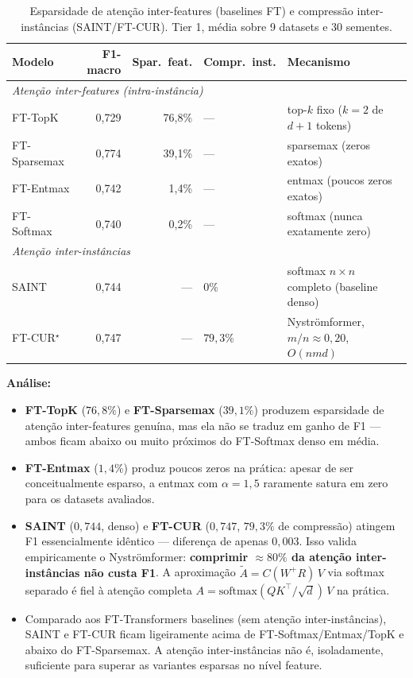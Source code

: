 \documentclass[12pt,a4paper]{article}
\begin{document}
\begin{table}[H]
\centering
\caption{Esparsidade de atenção inter-features (baselines FT) e compressão
inter-instâncias (SAINT/FT-CUR). Tier 1, média sobre 9 datasets e 30 sementes.}
\label{tab:sparsity_ft}
\begin{tabular}{lrrll}
\toprule
\textbf{Modelo} & \textbf{F1-macro} & \textbf{Spar.\ feat.} & \textbf{Compr.\ inst.} & \textbf{Mecanismo} \\
\midrule
\multicolumn{5}{l}{\textit{Atenção inter-features (intra-instância)}} \\
FT-TopK      & 0,729 & 76,8\% & --- & top-$k$ fixo ($k{=}2$ de $d{+}1$ tokens) \\
FT-Sparsemax & 0,774 & 39,1\% & --- & sparsemax (zeros exatos) \\
FT-Entmax    & 0,742 &  1,4\% & --- & entmax (poucos zeros exatos) \\
FT-Softmax   & 0,740 &  0,2\% & --- & softmax (nunca exatamente zero) \\
\midrule
\multicolumn{5}{l}{\textit{Atenção inter-instâncias}} \\
SAINT        & 0,744 & --- & $0\%$  & softmax $n{\times}n$ completo (baseline denso) \\
FT-CUR$^\star$ & 0,747 & --- & $79{,}3\%$ & Nyströmformer, $m/n{\approx}0{,}20$, $O(nmd)$ \\
\bottomrule
\end{tabular}
\end{table}

\textbf{Análise:}
\begin{itemize}
  \item \textbf{FT-TopK} ($76{,}8\%$) e \textbf{FT-Sparsemax} ($39{,}1\%$) produzem
        esparsidade de atenção inter-features genuína, mas ela não se traduz em ganho
        de F1 --- ambos ficam abaixo ou muito próximos do FT-Softmax denso em média.
  \item \textbf{FT-Entmax} ($1{,}4\%$) produz poucos zeros na prática: apesar de
        ser conceitualmente esparso, a entmax com $\alpha{=}1{,}5$ raramente satura
        em zero para os datasets avaliados.
  \item \textbf{SAINT} ($0{,}744$, denso) e \textbf{FT-CUR} ($0{,}747$, $79{,}3\%$
        de compressão) atingem F1 essencialmente idêntico --- diferença de apenas
        $0{,}003$. Isso valida empiricamente o Nyströmformer: \textbf{comprimir
        $\approx 80\%$ da atenção inter-instâncias não custa F1}. A aproximação
        $\tilde A = C(W^+ R)\,V$ via softmax separado é fiel à atenção completa
        $A = \text{softmax}(QK^\top/\sqrt d)\,V$ na prática.
  \item Comparado aos FT-Transformers baselines (sem atenção inter-instâncias),
        SAINT e FT-CUR ficam ligeiramente acima de FT-Softmax/Entmax/TopK e abaixo
        do FT-Sparsemax. A atenção inter-instâncias não é, isoladamente, suficiente
        para superar as variantes esparsas no nível feature.
\end{itemize}
\end{document}
